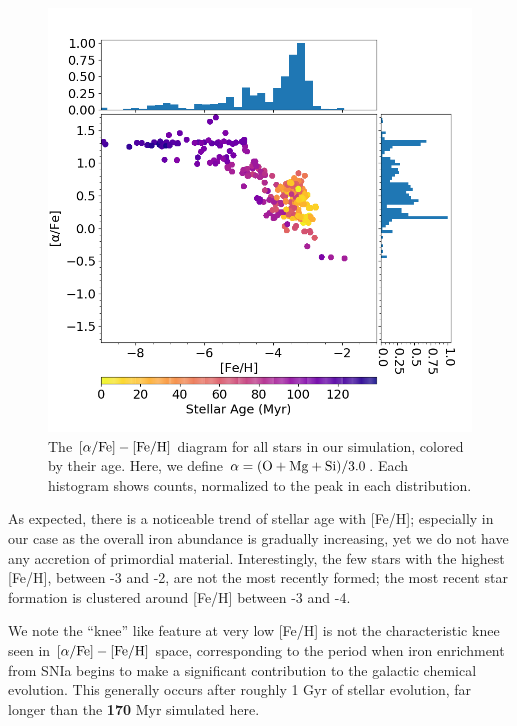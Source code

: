 \documentclass[twocolumn]{aastex61}
\begin{document}
\begin{figure}
\includegraphics[width=0.95\linewidth]{alpha_over_fe_hist}
\caption{The $[\alpha / {\rm Fe}]-[\rm{Fe}/\rm{H}]$
diagram for all stars in our simulation, colored by their age. Here, we define $\alpha = (\rm{O} + \rm{Mg} + \rm{Si})/3.0$. Each histogram shows counts, normalized to the peak in each distribution.}
\label{fig:stellar_abundance}
\end{figure}

As expected, there is a noticeable trend of stellar age with [Fe/H]; especially in our case as the overall iron abundance is gradually increasing, yet we do not have any accretion of primordial material. Interestingly, the few stars with the highest [Fe/H], between -3 and -2, are not the most recently formed; the most recent star formation is clustered around [Fe/H] between -3 and -4.

We note the ``knee'' like feature at very low [Fe/H] is not the characteristic knee seen in $[\alpha / {\rm Fe}]-[\rm{Fe}/\rm{H}]$ space, corresponding to the period when iron enrichment from SNIa begins to make a significant contribution to the galactic chemical evolution. This generally occurs after roughly 1 Gyr of stellar evolution, far longer than the \textbf{170} Myr simulated here. %
\end{document}
